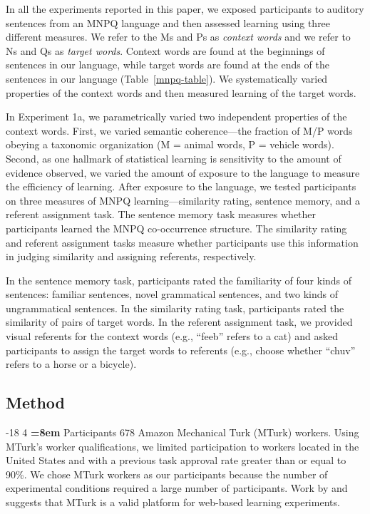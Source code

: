 \documentclass[man,longtable,floatsintext]{my-apa6}
\makeatletter
\renewcommand\subsubsection{\@startsection{subsubsection}{3}{\z@}%
                       {-18\p@ \@plus -4\p@ \@minus -4\p@}%
                       {4\p@ \@plus 2\p@ \@minus 2\p@}%
                       {\normalfont\normalsize\bfseries\boldmath
                        \rightskip=\z@ \@plus 8em\pretolerance=10000 }}
\makeatother
\begin{document}
In all the experiments reported in this paper, we exposed participants to auditory sentences from an MNPQ language and then assessed learning using three different measures. We refer to the Ms and Ps as \emph{context words} and we refer to Ns and Qs as \emph{target words}. Context words are found at the beginnings of sentences in our language, while target words are found at the ends of the sentences in our language (Table~\ref{mnpq-table}). We systematically varied properties of the context words and then measured learning of the target words.

In Experiment 1a, we parametrically varied two independent properties of the context words. First, we varied semantic coherence---the fraction of M/P words obeying a taxonomic organization (M = animal words, P = vehicle words). Second, as one hallmark of statistical learning is sensitivity to the amount of evidence observed, we varied the amount of exposure to the language to measure the efficiency of learning. After exposure to the language, we tested participants on three measures of MNPQ learning---similarity rating, sentence memory, and a referent assignment task. The sentence memory task measures whether participants learned the MNPQ co-occurrence structure. The similarity rating and referent assignment tasks measure whether participants use this information in judging similarity and assigning referents, respectively.

In the sentence memory task, participants rated the familiarity of four kinds of sentences: familiar sentences, novel grammatical sentences, and two kinds of ungrammatical sentences. In the similarity rating task, participants rated the similarity of pairs of target words. In the referent assignment task, we provided visual referents for the context words (e.g., ``feeb'' refers to a cat) and asked participants to assign the target words to referents (e.g., choose whether ``chuv'' refers to a horse or a bicycle).

\subsection{Method}

\subsubsection{Participants}
678 Amazon Mechanical Turk (MTurk) workers. Using MTurk's worker qualifications, we limited participation to workers located in the United States and with a previous task approval rate greater than or equal to 90\%. We chose MTurk workers as our participants because the number of experimental conditions required a large number of participants. Work by \citet{buhrmester2010} and \citet{crump2013} suggests that MTurk is a valid platform for web-based learning experiments.
\end{document}
